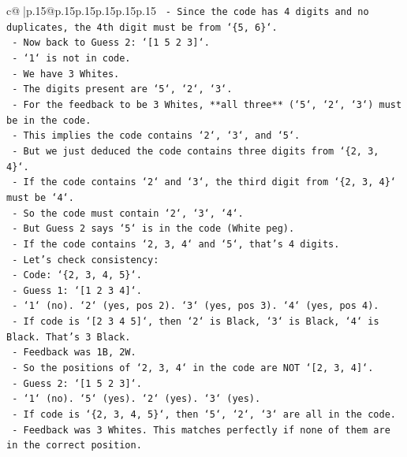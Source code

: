 \documentclass{article}
\begin{document}
{\begin{supertabular}{c@{$\;$}|p{.15\linewidth}@{}p{.15\linewidth}p{.15\linewidth}p{.15\linewidth}p{.15\linewidth}p{.15\linewidth}}
{{{\texttt{      {-} Since the code has 4 digits and no duplicates, the 4th digit must be from `\{5, 6\}`.} \\
\texttt{      {-} Now back to Guess 2: `{[}1 5 2 3{]}`.} \\
\texttt{        {-} `1` is not in code.} \\
\texttt{        {-} We have 3 Whites.} \\
\texttt{        {-} The digits present are `5`, `2`, `3`.} \\
\texttt{        {-} For the feedback to be 3 Whites, **all three** (`5`, `2`, `3`) must be in the code.} \\
\texttt{        {-} This implies the code contains `2`, `3`, and `5`.} \\
\texttt{        {-} But we just deduced the code contains three digits from `\{2, 3, 4\}`.} \\
\texttt{        {-} If the code contains `2` and `3`, the third digit from `\{2, 3, 4\}` must be `4`.} \\
\texttt{        {-} So the code must contain `2`, `3`, `4`.} \\
\texttt{        {-} But Guess 2 says `5` is in the code (White peg).} \\
\texttt{        {-} If the code contains `2, 3, 4` and `5`, that's 4 digits.} \\
\texttt{        {-} Let's check consistency:} \\
\texttt{          {-} Code: `\{2, 3, 4, 5\}`.} \\
\texttt{          {-} Guess 1: `{[}1 2 3 4{]}`.} \\
\texttt{            {-} `1` (no). `2` (yes, pos 2). `3` (yes, pos 3). `4` (yes, pos 4).} \\
\texttt{            {-} If code is `{[}2 3 4 5{]}`, then `2` is Black, `3` is Black, `4` is Black. That's 3 Black.} \\
\texttt{            {-} Feedback was 1B, 2W.} \\
\texttt{            {-} So the positions of `2, 3, 4` in the code are NOT `{[}2, 3, 4{]}`.} \\
\texttt{          {-} Guess 2: `{[}1 5 2 3{]}`.} \\
\texttt{            {-} `1` (no). `5` (yes). `2` (yes). `3` (yes).} \\
\texttt{            {-} If code is `\{2, 3, 4, 5\}`, then `5`, `2`, `3` are all in the code.} \\
\texttt{            {-} Feedback was 3 Whites. This matches perfectly if none of them are in the correct position.} \\
}}}
\end{supertabular}}
\end{document}
